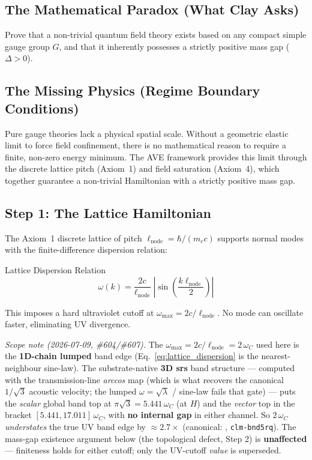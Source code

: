 \subsection{The Mathematical Paradox (What Clay Asks)}
Prove that a non-trivial quantum field theory exists based on any compact simple gauge group $G$, and that it inherently possesses a strictly positive mass gap ($\Delta > 0$).

\subsection{The Missing Physics (Regime Boundary Conditions)}
Pure gauge theories lack a physical spatial scale. Without a geometric elastic limit to force field confinement, there is no mathematical reason to require a finite, non-zero energy minimum. The AVE framework provides this limit through the discrete lattice pitch (Axiom~1) and field saturation (Axiom~4), which together guarantee a non-trivial Hamiltonian with a strictly positive mass gap.

\subsection{Step 1: The Lattice Hamiltonian}

The Axiom~1 discrete lattice of pitch $\ell_\mathrm{node} = \hbar/(m_e c)$ supports normal modes with the finite-difference dispersion relation:
\begin{resultbox}{Lattice Dispersion Relation}
\begin{equation}
    \omega(k) = \frac{2c}{\ell_\mathrm{node}}\;\left|\sin\!\left(\frac{k\ell_\mathrm{node}}{2}\right)\right|
    \label{eq:lattice_dispersion}
\end{equation}
\end{resultbox}
This imposes a hard ultraviolet cutoff at $\omega_\mathrm{max} = 2c/\ell_\mathrm{node}$. No mode can oscillate faster, eliminating UV divergence.

\emph{Scope note (2026-07-09, \#604/\#607).} The $\omega_\mathrm{max} = 2c/\ell_\mathrm{node} = 2\,\omega_C$ used here is the \textbf{1D-chain lumped} band edge (Eq.~\ref{eq:lattice_dispersion} is the nearest-neighbour sine-law). The substrate-native \textbf{3D srs} band structure --- computed with the transmission-line \emph{arccos} map (which is what recovers the canonical $1/\sqrt3$ acoustic velocity; the lumped $\omega=\sqrt\lambda$ / sine-law fails that gate) --- puts the \emph{scalar} global band top at $\pi\sqrt3 = 5.441\,\omega_C$ (at $H$) and the \emph{vector} top in the bracket $[5.441, 17.011]\,\omega_C$, with \textbf{no internal gap} in either channel. So $2\,\omega_C$ \emph{understates} the true UV band edge by $\approx 2.7\times$ (canonical: , \texttt{clm-bnd5rq}). The mass-gap existence argument below (the topological defect, Step 2) is \textbf{unaffected} --- finiteness holds for either cutoff; only the UV-cutoff \emph{value} is superseded.

